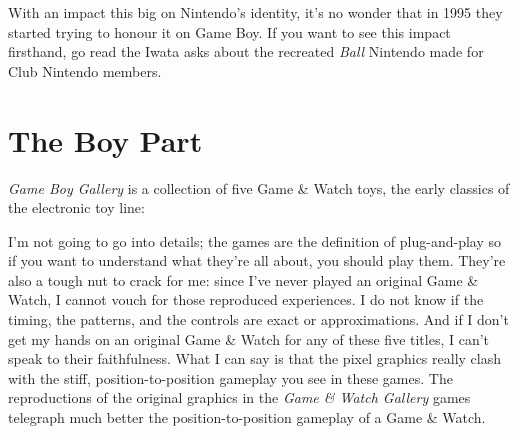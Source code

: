 \documentclass{book}
\begin{document}
With an impact this big on Nintendo’s identity, it’s no wonder that in 1995 they started trying to honour it on Game Boy. If you want to see this impact firsthand, go read the Iwata asks about the recreated \emph{Ball} Nintendo made for Club Nintendo members.\par
\FloatBarrier\section*{The Boy Part}
\emph{Game Boy Gallery} is a collection of five Game \& Watch toys, the early classics of the electronic toy line:\par
\FloatBarrier\vspace{\baselineskip}\centering
\begin{minipage}{0.45\linewidth}\captionsetup{labelformat=empty}\end{minipage}\vspace{2pt}
\begin{minipage}{0.45\linewidth}\captionsetup{labelformat=empty}\end{minipage}\vspace{2pt}
\begin{minipage}{0.45\linewidth}\captionsetup{labelformat=empty}\end{minipage}\vspace{2pt}
\begin{minipage}{0.45\linewidth}\captionsetup{labelformat=empty}\end{minipage}\vspace{2pt}
\begin{minipage}{0.45\linewidth}\captionsetup{labelformat=empty}\end{minipage}
\par\justifying
I’m not going to go into details; the games are the definition of plug-and-play so if you want to understand what they’re all about, you should play them. They’re also a tough nut to crack for me: since I’ve never played an original Game \& Watch, I cannot vouch for those reproduced experiences. I do not know if the timing, the patterns, and the controls are exact or approximations. And if I don’t get my hands on an original Game \& Watch for any of these five titles, I can’t speak to their faithfulness. What I can say is that the pixel graphics really clash with the stiff, position-to-position gameplay you see in these games. The reproductions of the original graphics in the \emph{Game \& Watch Gallery} games telegraph much better the position-to-position gameplay of a Game \& Watch.\par
\end{document}
